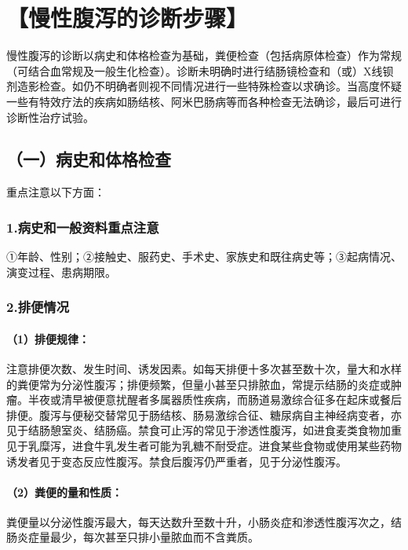 \section{【慢性腹泻的诊断步骤】}

慢性腹泻的诊断以病史和体格检查为基础，粪便检查（包括病原体检查）作为常规（可结合血常规及一般生化检查）。诊断未明确时进行结肠镜检查和（或）X线钡剂造影检查。如仍不明确者则视不同情况进行一些特殊检查以求确诊。当高度怀疑一些有特效疗法的疾病如肠结核、阿米巴肠病等而各种检查无法确诊，最后可进行诊断性治疗试验。

\subsection{（一）病史和体格检查}

重点注意以下方面：

\subsubsection{1.病史和一般资料重点注意}

①年龄、性别；②接触史、服药史、手术史、家族史和既往病史等；③起病情况、演变过程、患病期限。

\subsubsection{2.排便情况}

\paragraph{（1）排便规律：}

注意排便次数、发生时间、诱发因素。如每天排便十多次甚至数十次，量大和水样的粪便常为分泌性腹泻；排便频繁，但量小甚至只排脓血，常提示结肠的炎症或肿瘤。半夜或清早被便意扰醒者多属器质性疾病，而肠道易激综合征多在起床或餐后排便。腹泻与便秘交替常见于肠结核、肠易激综合征、糖尿病自主神经病变者，亦见于结肠憩室炎、结肠癌。禁食可止泻的常见于渗透性腹泻，如进食麦类食物加重见于乳糜泻，进食牛乳发生者可能为乳糖不耐受症。进食某些食物或使用某些药物诱发者见于变态反应性腹泻。禁食后腹泻仍严重者，见于分泌性腹泻。

\paragraph{（2）粪便的量和性质：}

粪便量以分泌性腹泻最大，每天达数升至数十升，小肠炎症和渗透性腹泻次之，结肠炎症量最少，每次甚至只排小量脓血而不含粪质。

